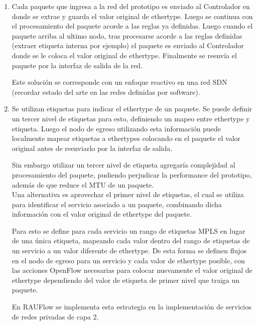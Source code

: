 \begin{enumerate}
\item Cada paquete que ingresa a la red del prototipo es enviado al Controlador en donde se extrae y guarda el valor original de ethertype. Luego se continua con el procesamiento del paquete acorde a las reglas ya definidas. Luego cuando el paquete arriba al ultimo nodo, tras procesarse acorde a las reglas definidas (extraer etiqueta interna por ejemplo) el paquete es enviado al Controlador donde se le coloca el valor original de ethertype. Finalmente se reenv\'ia el paquete por la interfaz de salida de la red.

Este soluci\'on se corresponde con un enfoque reactivo en una red SDN (recordar estado del arte en las redes definidas por software).

\item Se utilizan etiquetas para indicar el ethertype de un paquete. Se puede definir un tercer nivel de etiquetas para esto, definiendo un mapeo entre ethertype y etiqueta. Luego el nodo de egreso utilizando esta informaci\'on puede localmente mapear etiquetas a ethertypes colocando en el paquete el valor original antes de reenviarlo por la interfaz de salida. 

Sin embargo utilizar un tercer nivel de etiqueta agregar\'ia complejidad al procesamiento del paquete, pudiendo perjudicar la performance del prototipo, adem\'as de que reduce el MTU de un paquete.\\ 

Una alternativa es aprovechar el primer nivel de etiquetas, el cual se utiliza para identificar el servicio asociado a un paquete, combinando dicha informaci\'on con el valor original de ethertype del paquete.

Para esto se define para cada servicio un rango de etiquetas MPLS en lugar de una \'unica etiqueta, mapeando cada valor dentro del rango de etiquetas de un servicio a un valor diferente de ethertype. De esta forma se definen flujos en el nodo de egreso para un servicio y cada valor de ethertype posible, con las acciones OpenFlow necesarias para colocar nuevamente el valor original de ethertype dependiendo del valor de etiqueta de primer nivel que traiga un paquete.   


En RAUFlow se implementa esta estrategia en la implementaci\'on de servicios de redes privadas de capa 2. 

\end{enumerate} 

